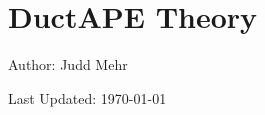 \chapter{DuctAPE Theory}

\noindent Author: Judd Mehr

\noindent Last Updated: \today











\clearpage
\newpage
\begin{subappendices}
    
    
    
    
\end{subappendices}

\clearpage
\newpage
\let\oldaddcontentsline\addcontentsline%
\renewcommand{\addcontentsline}[3]{}%
\printbibliography[title=References,heading=subbibliography]
\let\addcontentsline\oldaddcontentsline%

% 
